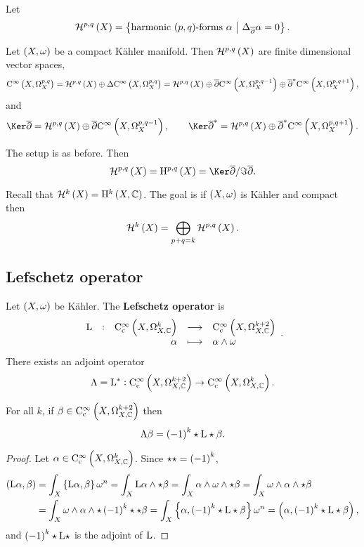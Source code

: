 Let
$$ \HHH^{p, q}\br{X} = \cbr{\text{harmonic $ \br{p, q} $-forms} \ \alpha \st \Delta_{\overline{\partial}}\alpha = 0}. $$

\begin{theorem}
\label{thm:6.21}
Let $ \br{X, \omega} $ be a compact K\"ahler manifold. Then $ \HHH^{p, q}\br{X} $ are finite dimensional vector spaces,
$$ \C^\infty\br{X, \Omega_X^{p, q}} = \HHH^{p, q}\br{X} \oplus \Delta\C^\infty\br{X, \Omega_X^{p, q}} = \HHH^{p, q}\br{X} \oplus \overline{\partial}\C^\infty\br{X, \Omega_X^{p, q - 1}} \oplus \overline{\partial}^*\C^\infty\br{X, \Omega_X^{p, q + 1}}, $$
and
$$ \Ker \overline{\partial} = \HHH^{p, q}\br{X} \oplus \overline{\partial}\C^\infty\br{X, \Omega_X^{p, q - 1}}, \qquad \Ker \overline{\partial}^* = \HHH^{p, q}\br{X} \oplus \overline{\partial}^*\C^\infty\br{X, \Omega_X^{p, q + 1}}. $$
\end{theorem}

\begin{theorem}
\label{thm:6.22}
The setup is as before. Then
$$ \HHH^{p, q}\br{X} = \H^{p, q}\br{X} = \Ker \overline{\partial} / \Im \overline{\partial}. $$
\end{theorem}

Recall that $ \HHH^k\br{X} = \H^k\br{X, \CC} $. The goal is if $ \br{X, \omega} $ is K\"ahler and compact then
$$ \HHH^k\br{X} = \bigoplus_{p + q = k} \HHH^{p, q}\br{X}. $$

\subsection{Lefschetz operator}

\begin{definition}
Let $ \br{X, \omega} $ be K\"ahler. The \textbf{Lefschetz operator} is
$$ \function[\L]{\C_\c^\infty\br{X, \Omega_{X, \CC}^k}}{\C_\c^\infty\br{X, \Omega_{X, \CC}^{k + 2}}}{\alpha}{\alpha \wedge \omega}. $$
There exists an adjoint operator
$$ \Lambda = \L^* : \C_\c^\infty\br{X, \Omega_{X, \CC}^{k + 2}} \to \C_\c^\infty\br{X, \Omega_{X, \CC}^k}. $$
\end{definition}

\begin{lemma}
For all $ k $, if $ \beta \in \C_\c^\infty\br{X, \Omega_{X, \CC}^{k + 2}} $ then
$$ \Lambda\beta = \br{-1}^k\star\L\star\beta. $$
\end{lemma}

\begin{proof}
Let $ \alpha \in \C_\c^\infty\br{X, \Omega_{X, \CC}^k} $. Since $ \star\star = \br{-1}^k $,
\begin{align*}
\br{\L\alpha, \beta}
& = \int_X \cbr{\L\alpha, \beta}\omega^n
= \int_X \L\alpha \wedge \star\beta
= \int_X \alpha \wedge \omega \wedge \star\beta
= \int_X \omega \wedge \alpha \wedge \star\beta \\
& = \int_X \omega \wedge \alpha \wedge \star\br{-1}^k\star\star\beta
= \int_X \cbr{\alpha, \br{-1}^k\star\L\star\beta}\omega^n
= \br{\alpha, \br{-1}^k\star\L\star\beta},
\end{align*}
and $ \br{-1}^k\star\L\star $ is the adjoint of $ \mathrm{L} $.
\end{proof}

